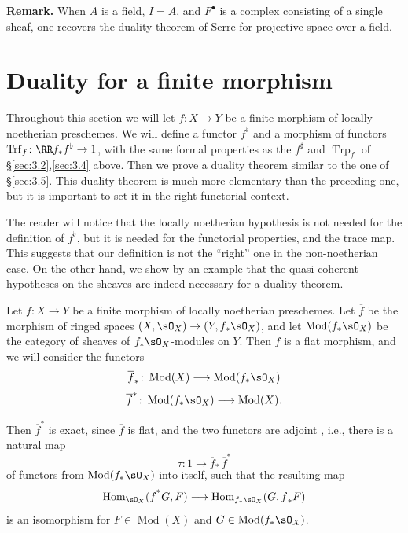 \textbf{Remark.}
When $A$ is a field, $I=A$, and $F^\bullet$ is a complex consisting of a single sheaf, one recovers the duality theorem of Serre for projective space over a field.

\section{Duality for a finite morphism}\label{sec:3.6}

Throughout this section we will let $f\colon X\to Y$ be a finite morphism of locally noetherian preschemes. We will define a functor $f^{\flat}$ and a morphism of functors $\operatorname{Trf}_f\colon \RR f_* f^{\flat}\to 1$, with the same formal properties as the $f^{\sharp}$ and $\operatorname{Trp}_f$ of \S\ref{sec:3.2},\ref{sec:3.4} above. Then we prove a duality theorem similar to the one of \S\ref{sec:3.5}. This duality theorem is much more elementary than the preceding one, but it is important to set it in the right functorial context.

The reader will notice that the locally noetherian hypothesis is not needed for the definition of $f^{\flat}$, but it is needed for the functorial properties, and the trace map. This suggests that our definition is not the ``right'' one in the non-noetherian case. On the other hand, we show by an example that the quasi-coherent hypotheses on the sheaves are indeed necessary for a duality theorem.

Let $f\colon X\to Y$ be a finite morphism of locally noetherian preschemes. Let $\overline{f}$ be the morphism of ringed spaces $(X,\sO_X)\to(Y,f_*\sO_X)$, and let $\operatorname{Mod}(f_*\sO_X)$ be the category of sheaves of $f_*\sO_X$-modules on $Y$. Then $\overline{f}$ is a flat morphism, and we will consider the functors
\[
\overline{f}_*\colon \operatorname{Mod}(X) \longrightarrow \operatorname{Mod}(f_*\sO_X)
\]
\[
\overline{f}^*\colon \operatorname{Mod}(f_*\sO_X) \longrightarrow \operatorname{Mod}(X).
\]

Then $\overline{f}^*$ is exact, since $\overline{f}$ is flat, and the two functors are adjoint \cite[,~4.4]{EGA}, i.e., there is a natural map
\[
\tau\colon 1 \longrightarrow \overline{f}_*\,\overline{f}^*
\]
of functors from $\operatorname{Mod}(f_*\sO_X)$ into itself, such that the resulting map
\[
\operatorname{Hom}_{\sO_X}(\overline{f}^*G, F) \longrightarrow \operatorname{Hom}_{f_*\sO_X}(G, \overline{f}_*F)
\]
is an isomorphism for $F\in\operatorname{Mod}(X)$ and $G\in\operatorname{Mod}(f_*\sO_X)$.

